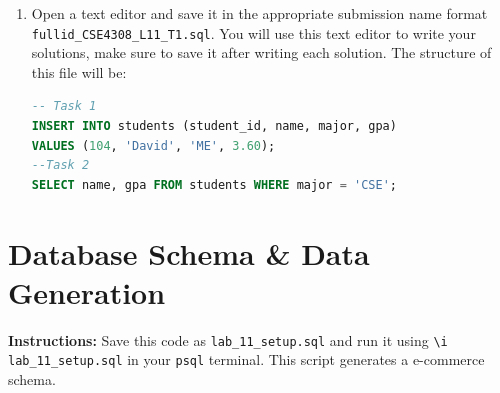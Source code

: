 \documentclass[12pt,a4paper]{article}
\begin{document}
\begin{enumerate}
After loading the SQL file, reconnect to PostgreSQL to verify that the tables have been created.

1. Reconnect to Your Database:

   \begin{lstlisting}[language=SQL]
   psql -h localhost -U student_12345 -d cse4308_12345
   \end{lstlisting}

2. Check Tables:

   Verify the tables have been created by listing them:

   \begin{lstlisting}[language=SQL]
   \dt
   \end{lstlisting}

3. View Table Data:

   Verify the data by running the following SQL queries:

   \begin{lstlisting}[language=SQL]
   SELECT * FROM <table_name>;
   \end{lstlisting}

\item Open a text editor and save it in the appropriate submission name format \\ \texttt{fullid\_CSE4308\_L11\_T1.sql}. You will use this text editor to write your solutions, make sure to save it after writing each solution. The structure of this file will be:
\begin{lstlisting}[language=SQL]
-- Task 1
INSERT INTO students (student_id, name, major, gpa)
VALUES (104, 'David', 'ME', 3.60);
--Task 2
SELECT name, gpa FROM students WHERE major = 'CSE';
\end{lstlisting}
\end{enumerate}
\newpage
\section{Database Schema \& Data Generation}
\textbf{Instructions:} Save this code as \texttt{lab\_11\_setup.sql} and run it using \texttt{\textbackslash i lab\_11\_setup.sql} in your \texttt{psql} terminal. This script generates a  e-commerce schema.
\end{document}
